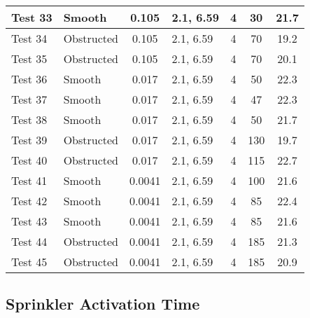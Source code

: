 \begin{table}[!h]
\begin{center}
\begin {tabular}{|l|l|c|l|c|c|c|}
Test 33    &  Smooth        &  0.105            &  2.1, 6.59  &  4             &  30              &  21.7              \\ \hline
Test 34    &  Obstructed    &  0.105            &  2.1, 6.59  &  4             &  70              &  19.2              \\ \hline
Test 35    &  Obstructed    &  0.105            &  2.1, 6.59  &  4             &  70              &  20.1              \\ \hline
Test 36    &  Smooth        &  0.017            &  2.1, 6.59  &  4             &  50              &  22.3              \\ \hline
Test 37    &  Smooth        &  0.017            &  2.1, 6.59  &  4             &  47              &  22.3              \\ \hline
Test 38    &  Smooth        &  0.017            &  2.1, 6.59  &  4             &  50              &  21.7              \\ \hline
Test 39    &  Obstructed    &  0.017            &  2.1, 6.59  &  4             &  130             &  19.7              \\ \hline
Test 40    &  Obstructed    &  0.017            &  2.1, 6.59  &  4             &  115             &  22.7              \\ \hline
Test 41    &  Smooth        &  0.0041           &  2.1, 6.59  &  4             &  100             &  21.6              \\ \hline
Test 42    &  Smooth        &  0.0041           &  2.1, 6.59  &  4             &  85              &  22.4              \\ \hline
Test 43    &  Smooth        &  0.0041           &  2.1, 6.59  &  4             &  85              &  21.6              \\ \hline
Test 44    &  Obstructed    &  0.0041           &  2.1, 6.59  &  4             &  185             &  21.3              \\ \hline
Test 45    &  Obstructed    &  0.0041           &  2.1, 6.59  &  4             &  185             &  20.9              \\ \hline
\end{tabular}
\end{center}
\end{table}


\clearpage


\subsection*{Sprinkler Activation Time}


